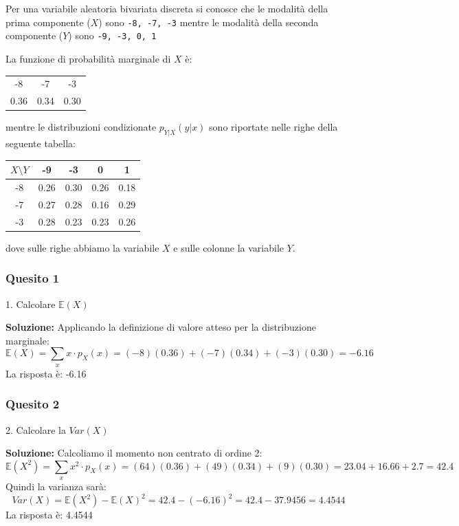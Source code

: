 \documentclass[12pt, a4paper]{article}
\begin{document}
\begin{tcolorbox}[colback=lightergray!10, colframe=tocsec, title=\textbf{Esercizio 1}]
Per una variabile aleatoria bivariata discreta si conosce che le modalità della prima componente ($X$) sono 
\texttt{-8, -7, -3} 
mentre le modalità della seconda componente ($Y$) sono 
\texttt{-9, -3, 0, 1}

La funzione di probabilità marginale di $X$ è:
\begin{center}
\begin{tabular}{ccc}
\toprule
-8 & -7 & -3 \\
0.36 & 0.34 & 0.30 \\
\bottomrule
\end{tabular}
\end{center}

mentre le distribuzioni condizionate $p_{Y|X}(y|x)$ sono riportate nelle righe della seguente tabella:
\begin{center}
\begin{tabular}{c|cccc}
\toprule
$X \setminus Y$ & -9 & -3 & 0 & 1 \\
\midrule
-8 & 0.26 & 0.30 & 0.26 & 0.18 \\
-7 & 0.27 & 0.28 & 0.16 & 0.29 \\
-3 & 0.28 & 0.23 & 0.23 & 0.26 \\
\bottomrule
\end{tabular}
\end{center}
dove sulle righe abbiamo la variabile $X$ e sulle colonne la variabile $Y$.
\end{tcolorbox}

\subsubsection*{Quesito 1}
1. Calcolare $\mathbb{E}(X)$

\textbf{Soluzione:}
Applicando la definizione di valore atteso per la distribuzione marginale:
$$ \mathbb{E}(X) = \sum_x x \cdot p_X(x) = (-8)(0.36) + (-7)(0.34) + (-3)(0.30) = -6.16 $$
La risposta è: -6.16

\subsubsection*{Quesito 2}
2. Calcolare la $Var(X)$

\textbf{Soluzione:}
Calcoliamo il momento non centrato di ordine 2:
$$ \mathbb{E}(X^2) = \sum_x x^2 \cdot p_X(x) = (64)(0.36) + (49)(0.34) + (9)(0.30) = 23.04 + 16.66 + 2.7 = 42.4 $$
Quindi la varianza sarà:
$$ Var(X) = \mathbb{E}(X^2) - \mathbb{E}(X)^2 = 42.4 - (-6.16)^2 = 42.4 - 37.9456 = 4.4544 $$
La risposta è: 4.4544
\end{document}
